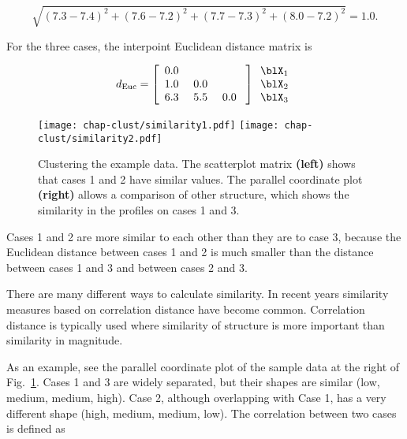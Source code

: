 \[
\sqrt{(7.3-7.4)^2+(7.6-7.2)^2+(7.7-7.3)^2+(8.0-7.2)^2} = 1.0.
\]


\noindent For the three cases, the interpoint Euclidean distance matrix is

\begin{eqnarray*}
d_{\rm Euc} =
\left[ \begin{array}{ccc}
 0.0  ~&     &   \\ 
 1.0 ~&  0.0 ~  &  \\
 6.3 ~& 5.5 ~&  0.0 ~ \\
\end{array} \right]
\begin{array}{r}
\blX_1 \\ \blX_2 \\ \blX_3 \\
\end{array}
\end{eqnarray*}

\begin{figure}[htp]
\centerline{{\texttt{[image: chap-clust/similarity1.pdf]}}
 {\texttt{[image: chap-clust/similarity2.pdf]}}}
\caption[Clustering the example data]{Clustering the example data.
The scatterplot matrix {\bf (left)} shows that cases 1 and 2 have
similar values.  The parallel coordinate plot {\bf (right)} allows a
comparison of other structure, which shows the similarity in the profiles
on cases 1 and 3.  }
\label{similarity1}
\end{figure}

\noindent Cases 1 and 2 are more similar to each other than they are
to case 3, because the Euclidean distance between cases 1 and 2 is
much smaller than the distance between cases 1 and 3 and between cases
2 and 3.

There are many different ways to calculate similarity.  In recent
years similarity measures based on correlation distance have become
common. Correlation distance is typically used where similarity of
structure is more important than similarity in magnitude. 


As an example, see the parallel coordinate plot of the sample data at
the right of Fig.~\ref{similarity1}.  Cases 1 and 3 are widely
separated, but their shapes are similar (low, medium, medium, high).
Case 2, although overlapping with Case 1, has a very different shape
(high, medium, medium, low).  The correlation between two cases is
defined as

